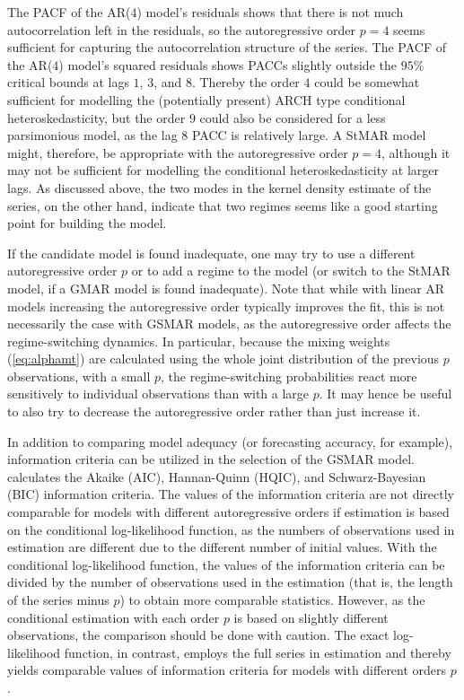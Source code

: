 \documentclass[nojss]{jss} %
\begin{document}
The PACF of the AR($4$) model's residuals shows that there is not much autocorrelation left in the residuals, so the autoregressive order $p=4$ seems sufficient for capturing the autocorrelation structure of the series. The PACF of the AR($4$) model's squared residuals shows PACCs slightly outside the $95\%$ critical bounds at lags $1$, $3$, and $8$. Thereby the order $4$ could be somewhat sufficient for modelling the (potentially present) ARCH type conditional heteroskedasticity, but the order $9$ could also be considered for a less parsimonious model, as the lag $8$ PACC is relatively large. A StMAR model might, therefore, be appropriate with the autoregressive order $p=4$, although it may not be sufficient for modelling the conditional heteroskedasticity at larger lags. As discussed above, the two modes in the kernel density estimate of the series, on the other hand, indicate that two regimes seems like a good starting point for building the model.

If the candidate model is found inadequate, one may try to use a different autoregressive order $p$ or to add a regime to the model (or switch to the StMAR model, if a GMAR model is found inadequate). Note that while with linear AR models increasing the autoregressive order typically improves the fit, this is not necessarily the case with GSMAR models, as the autoregressive order affects the regime-switching dynamics. In particular, because the mixing weights (\ref{eq:alphamt}) are calculated using the whole joint distribution of the previous $p$ observations, with a small $p$, the regime-switching probabilities react more sensitively to individual observations than with a large $p$. It may hence be useful to also try to decrease the autoregressive order rather than just increase it.

In addition to comparing model adequacy (or forecasting accuracy, for example), information criteria can be utilized in the selection of the GSMAR model.  calculates the Akaike (AIC), Hannan-Quinn (HQIC), and Schwarz-Bayesian (BIC) information criteria. The values of the information criteria are not directly comparable for models with different autoregressive orders if estimation is based on the conditional log-likelihood function, as the numbers of observations used in estimation are different due to the different number of initial values. With the conditional log-likelihood function, the values of the information criteria can be divided by the number of observations used in the estimation (that is, the length of the series minus $p$) to obtain more comparable statistics. However, as the conditional estimation with each order $p$ is based on slightly different observations, the comparison should be done with caution. The exact log-likelihood function, in contrast, employs the full series in estimation and thereby yields comparable values of information criteria for models with different orders $p$.
\end{document}
